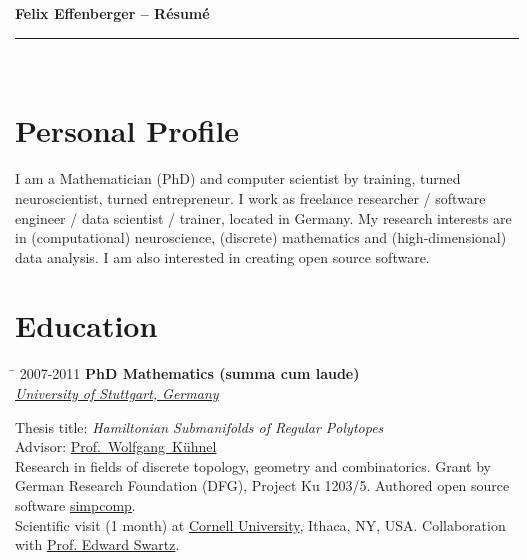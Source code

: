 \documentclass[10pt]{article} %
\newlength{\marginwidth}
\newlength{\smallertextwidth}
\renewcommand{\title}[1]{
{\huge{\color{headercolor}\textbf{#1}}}\\
\rule{\textwidth}{0.5mm}\\
}
\newcommand{\education}[4]{
\begin{tabbing}%
\hspace{\marginwidth}\=\kill%
{#1} \> \textbf{#2}\\
\>\+ \textit{#3}\\[5pt]
\begin{minipage}{\smallertextwidth}
\vspace{2mm}
#4
\end{minipage}
\end{tabbing}
\vspace{2mm}
}
\begin{document}

\title{Felix Effenberger -- Résumé}




\section{Personal Profile}
%
I am a Mathematician (PhD) and computer scientist by training, turned neuroscientist, turned entrepreneur. 
I work as freelance researcher / software engineer / data scientist / trainer, located in Germany.
My research interests are in (computational) neuroscience, (discrete) mathematics and (high-dimensional) data analysis.
I am also interested in creating open source software.


\section{Education}
%
\education
{2007-2011}
{PhD Mathematics \textmd{(summa cum laude)}}
{\href{https://uni-stuttgart.de}{University of Stuttgart, Germany}}
{
Thesis title: \textit{Hamiltonian Submanifolds of Regular Polytopes}\\
Advisor: \href{http://www.igt.uni-stuttgart.de/LstDiffgeo/Kuehnel/}{Prof.~Wolfgang~Kühnel}\\[5pt]
%
Research in fields of discrete topology, geometry and combinatorics.
Grant by German Research Foundation (DFG), Project Ku 1203/5.
Authored open source software \href{https://github.com/simpcomp-team/simpcomp}{simpcomp}.\\
Scientific visit (1 month) at \href{https://www.cornell.edu}{Cornell University}, Ithaca, NY, USA.
Collaboration with \href{http://pi.math.cornell.edu/~ebs/}{Prof. Edward Swartz}.
}
\end{document}
